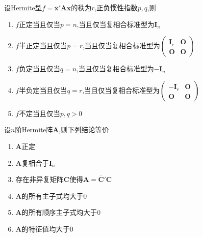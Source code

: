 \begin{formal}
    \begin{theorem}[正定的判定]\label{thm:正定的判定2}
        设\textup{Hermite}型$f=\overline{\bm{x}}'\bm{Ax}$的秩为$r$,正负惯性指数$p,q$,则\begin{enumerate}[label={\textup{(\arabic*)}}]
            \item $f$正定当且仅当$p=n$,当且仅当复相合标准型为$\bm{I}_n$
            \item $f$半正定当且仅当$p=r$,当且仅当复相合标准型为$\begin{pmatrix}
                \bm{I}_r&\bm{O}\\
                \bm{O}&\bm{O}
            \end{pmatrix}$
            \item $f$负定当且仅当$q=n$,当且仅当复相合标准型为$-\bm{I}_n$
            \item $f$半负定当且仅当$q=r$,当且仅当复相合标准型为$\begin{pmatrix}
                -\bm{I}_r&\bm{O}\\
                \bm{O}&\bm{O}
            \end{pmatrix}$
            \item $f$不定当且仅当$p,q>0$
        \end{enumerate}
    \end{theorem}
\end{formal}
\begin{formal}
    \begin{proposition}[正定的等价结论]\label{prop:正定的等价结论2}
        设$n$阶\textup{Hermite}阵$\bm{A}$,则下列结论等价\begin{enumerate}[label={\textup{(\arabic*)}}]
            \item $\bm{A}$正定
            \item $\bm{A}$复相合于$\bm{I}_n$
            \item 存在非异复矩阵$\bm{C}$使得$\bm{A}=\overline{\bm{C}}'\bm{C}$
            \item $\bm{A}$的所有主子式均大于$0$
            \item $\bm{A}$的所有顺序主子式均大于$0$
            \item $\bm{A}$的特征值均大于$0$
        \end{enumerate}
    \end{proposition}
\end{formal}

